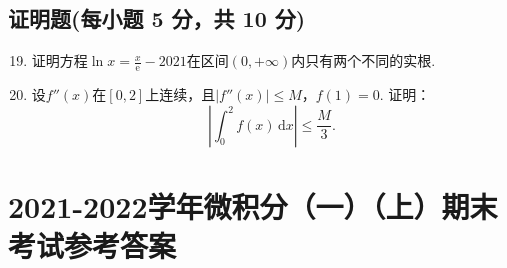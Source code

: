 \documentclass[../main.tex]{subfiles}
\begin{document}
\section{证明题(每小题 5 分，共 10 分)}
\begin{enumerate}
    \setcounter{enumi}{18}
    \item 证明方程$\ln x = \frac{x}{\mathrm{e}}-2021$在区间$(0,+\infty)$内只有两个不同的实根.
          \vspace{10em}

    \item 设$f''(x)$在$[0,2]$上连续，且$|f''(x)|\leq M$，$f(1)=0$. 证明：
          \[
              \left|\int_{0}^{2}f(x)\,\mathrm{d}x\right|\leq\frac{M}{3}.
          \]
          \vspace{10em}
\end{enumerate}

\chapter{2021-2022学年微积分（一）（上）期末考试参考答案}
\end{document}
